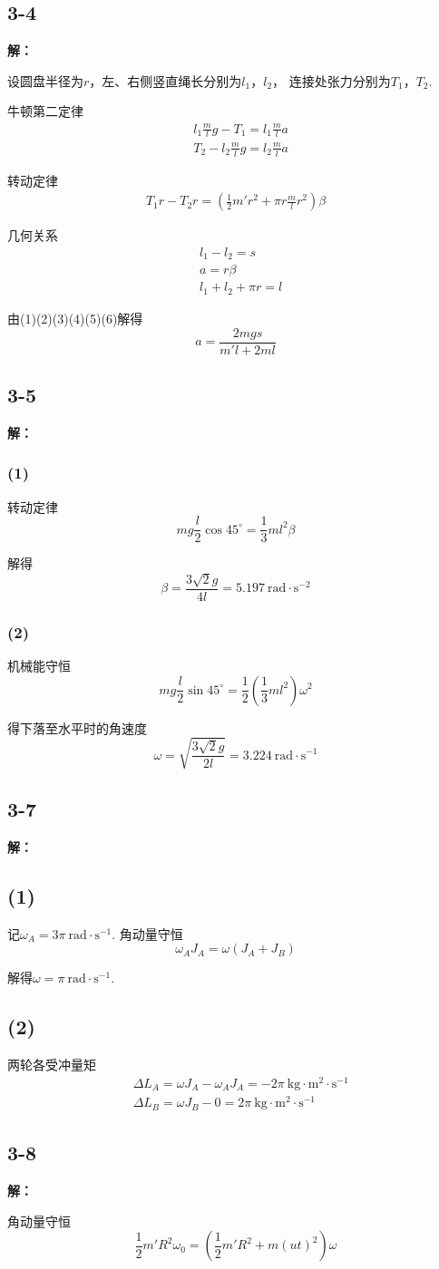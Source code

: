 \documentclass[twocolumn]{ctexart}
\newcommand{\sol}[1]{\subsection*{#1}\noindent\textbf{解：}

}
\begin{document}
	\sol{3-4}
	设圆盘半径为$r$，左、右侧竖直绳长分别为$l_1$，$l_2$， 连接处张力分别为$T_1$，$T_2$.
	
	牛顿第二定律
	\begin{align}
		&l_1\frac{m}{l}g-T_1=l_1\frac{m}{l}a\\
		&T_2-l_2\frac{m}{l}g=l_2\frac{m}{l}a
	\end{align}
	
	转动定律
	\begin{align}
		T_1r-T_2r=\left(\frac{1}{2}m'r^2+\pi r\frac{m}{l}r^2\right)\beta
	\end{align}

	几何关系
	\begin{align}
		&l_1-l_2=s\\
		&a=r\beta\\
		&l_1+l_2+\pi r=l
	\end{align}
	
	由(1)(2)(3)(4)(5)(6)解得
	$$a=\frac{2mgs}{m'l+2ml}$$
	\sol{3-5}
	\subsubsection*{(1)}
	转动定律
	$$mg\frac{l}{2}\cos45^\circ{}=\frac{1}{3}ml^2\beta$$
	
	解得
	$$\beta=\frac{3\sqrt{2}g}{4l}=5.197\ \mathrm{rad\cdot s^{-2}}$$
	\subsubsection*{(2)}
	机械能守恒
	$$mg\frac{l}{2}\sin45^\circ{}=\frac{1}{2}\left(\frac{1}{3}ml^2\right)\omega^2$$
	
	得下落至水平时的角速度
	$$\omega=\sqrt{\frac{3\sqrt{2}g}{2l}}=3.224\ \mathrm{rad\cdot s^{-1}}$$
	\sol{3-7}
	\subsection*{(1)}
	记$\omega_A=3\pi\ \mathrm{rad\cdot s^{-1}}$. 角动量守恒
	$$\omega_AJ_A=\omega\left(J_A+J_B\right)$$
	
	解得$\omega=\pi\ \mathrm{rad\cdot s^{-1}}$.
	\subsection*{(2)}
	两轮各受冲量矩
	\begin{align*}
		&\Delta L_A=\omega J_A-\omega_A J_A=-2\pi\ \mathrm{kg\cdot m^2\cdot s^{-1}}\\
		&\Delta L_B=\omega J_B-0=2\pi\ \mathrm{kg\cdot m^2\cdot s^{-1}}
	\end{align*}
	\sol{3-8}
	角动量守恒
	$$\frac{1}{2}m'R^2\omega_0=\left(\frac{1}{2}m'R^2+m(ut)^2\right)\omega$$
	
\end{document}
